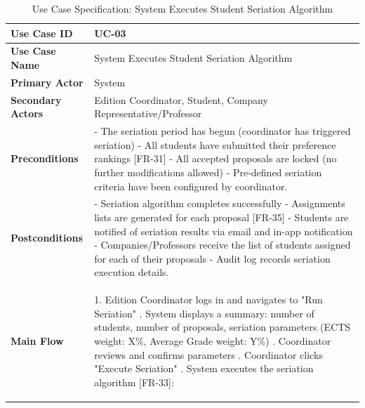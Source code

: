 \newpage
\renewcommand{\arraystretch}{1.5} 
\begin{xltabular}{\textwidth}{|l|X|}
    \caption{Use Case Specification: System Executes Student Seriation Algorithm} \label{tab:UC-03} \\
    
    \hline
    \textbf{Use Case ID} & UC-03 \\ \hline
    \textbf{Use Case Name} & System Executes Student Seriation Algorithm \\ \hline
    \textbf{Primary Actor} & System \\ \hline
    \textbf{Secondary Actors} & Edition Coordinator, Student, Company Representative/Professor \\ \hline
    \textbf{Preconditions} &
        - The seriation period has begun (coordinator has triggered seriation) \newline
        - All students have submitted their preference rankings [FR-31] \newline
        - All accepted proposals are locked (no further modifications allowed) \newline
        - Pre-defined seriation criteria have been configured by coordinator.
        \\ \hline
    \textbf{Postconditions} &
        - Seriation algorithm completes successfully \newline
        - Assignments lists are generated for each proposal [FR-35] \newline
        - Students are notified of seriation results via email and in-app notification \newline
        - Companies/Professors receive the list of students assigned for each of their proposals \newline
        - Audit log records seriation execution details.
        \\ \hline
    \textbf{Main Flow} &
        1. Edition Coordinator logs in and navigates to "Run Seriation" . System displays a summary: number of students, number of proposals, seriation parameters (ECTS weight: X\%, Average Grade weight: Y\%) . Coordinator reviews and confirms parameters . Coordinator clicks "Execute Seriation" . System executes the seriation algorithm [FR-33]: \newline
            \begin{itemize}

\end{itemize}
\end{xltabular}
